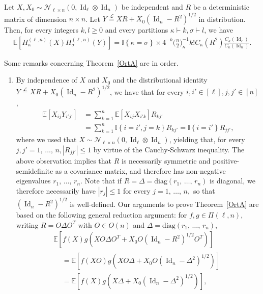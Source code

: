 \documentclass[AHL,Unicode,longabstracts,published]{cedram}
\DeclareMathOperator{\Id}{Id}
\newcommand{\scN}{\mathscr{N}}
\newcommand{\diag}{\mathrm{diag}}
\newcommand{\E}[1]{\mathbb{E}\left[#1\right]}
\newcommand{\eqLaw}{ \overset{\mathcal{L}}{=} }
\newcommand{\ind}[1]{\mathbb{I}
\left\{#1\right\}}
\newcommand*{\alphenumi}{\renewcommand*{\theenumi}{\alph{enumi}}}
\begin{document}
\begin{theo}\label{OrtA}
Let $X, X_0\sim \scN_{\ell \times n}(0, \Id_{\ell} \otimes \Id_n)$ be independent and $R$ be a deterministic matrix of dimension $n\times n$. Let $Y \eqLaw XR+X_0(\Id_n-R^2)^{1/2}$ in distribution. Then, for every integers $k,l \geq0$ and every partitions $\kappa \vdash k, \sigma\vdash l$, we have
\begin{gather}\label{RelOrtA}
\E{H_{\kappa}^{(\ell,n)}(X) H_{\sigma}^{(\ell,n)}(Y)} = \ind{\kappa=\sigma}\times 4^{-k}\bigg(\frac{n}{2}\bigg)_{\kappa}^{-1} k ! C_{\kappa}(R^2)\frac{C_{\kappa}(\Id_{\ell})}{C_{\kappa}(\Id_n)}.
\end{gather}
\end{theo}
Some remarks concerning Theorem~\ref{OrtA} are in order.
\begin{rema}\label{Rem:Ortho}\leavevmode
\begin{enumerate}\alphenumi
\item By independence of $X$ and $X_0$ and the distributional identity $Y \eqLaw XR+X_0(\Id_n-R^2)^{1/2}$, we have that for every $i,i'\in [\ell], j,j'\in [n]$,
\begin{align*}
\E{X_{ij}Y_{i'j'}} &= \sum_{k=1}^n\E{X_{ij}X_{i'k}}R_{kj'} \\
&= \sum_{k=1}^n \ind{i=i',j=k}R_{kj'} = \ind{i=i'}R_{jj'},
\end{align*}
where we used that $X\sim \scN_{\ell \times n}(0, \Id_{\ell} \otimes \Id_n)$, yielding that, for every $j,j'=1,\,\ldots,\,n, |R_{jj'}|\leq 1$ by virtue of the Cauchy-Schwarz inequality. The above observation implies that $R$ is necessarily symmetric and positive-semidefinite as a covariance matrix, and therefore has non-negative eigenvalues $r_1,\,\ldots,\,r_n$. Note that if $R=\Delta=\diag(r_1,\,\ldots,\,r_n)$ is diagonal, we therefore necessarily have $|r_j|\leq 1$ for every $j=1,\,\ldots,\,n,$ so that $(\Id_n-R^2)^{1/2}$ is well-defined. Our arguments to prove Theorem~\ref{OrtA} are based on the following general reduction argument: for $f,g\in \Pi(\ell,n)$, writing $R=O\Delta O^T$ with $O\in O(n)$ and $\Delta=\diag(r_1,\,\ldots,\,r_n)$,
\begin{multline*}
\E{f(X)g\left(XO\Delta O^T+X_0O\left(\Id_n-R^2\right)^{1/2}O^T\right)}\\
\begin{aligned}
&= \E{f(XO)g\left(XO\Delta +X_0O\left(\Id_n-\Delta^2\right)^{1/2}\right)}\\
&=\E{f(X)g\left(X\Delta +X_0\left(\Id_n-\Delta^2\right)^{1/2}\right)},
\end{aligned}

\end{multline*}
\end{enumerate}
\end{rema}
\end{document}
